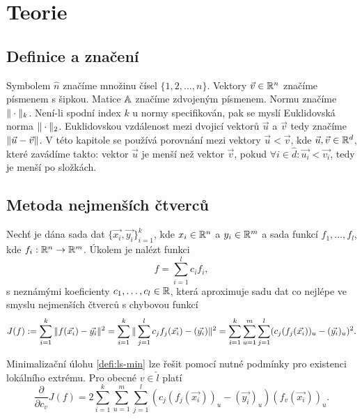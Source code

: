 \chapter{Teorie}

\section{Definice a značení}

Symbolem $\hat n$ značíme množinu čísel $\{1, 2, \ldots, n\}$. Vektory $\vec{v} \in \mathbb{R}^n$ značíme písmenem s šipkou. Matice $\mathbb{A}$ značíme zdvojeným písmenem. Normu značíme $\|\cdot\|_k$. Není-li spodní index $k$ u normy specifikován, pak se myslí Euklidovská norma $\|\cdot\|_2$. Euklidovskou vzdálenost mezi dvojicí vektorů $\vec{u}$ a $\vec{v}$ tedy značíme $\|\vec{u} - \vec{v}\|$. V této kapitole se používá porovnání mezi vektory $\vec{u} < \vec{v}$, kde $\vec{u}, \vec{v} \in \mathbb{R}^d$, které zavádíme takto: vektor $\vec{u}$ je menší než vektor $\vec{v}$, pokud $\forall i \in \hat{d}: \vec{u_i} < \vec{v_i}$, tedy je menší po složkách.

\section{Metoda nejmenších čtverců}

Nechť je dána sada dat $\{\vec{x_i}, \vec{y_i}\}_{i = 1}^k$, kde $x_i \in \mathbb{R}^n$ a $y_i \in \mathbb{R}^m$ a sada funkcí $f_1,\ldots,f_l$, kde $f_i: \mathbb{R}^n \rightarrow \mathbb{R}^m$. Úkolem je nalézt funkci
\begin{equation}
  \label{defi:ls}
  f = \sum_{i=1}^l c_if_i,
\end{equation}
s neznámými koeficienty $c_1,\ldots,c_l \in \mathbb{R}$, která aproximuje sadu dat co nejlépe ve smyslu nejmenších čtverců s chybovou funkcí
\begin{equation}
\label{defi:ls-min}
  J(f) := \sum_{i=1}^k \|f(\vec{x_i}) - \vec{y_i}\|^2 =
  \sum_{i=1}^k\|\sum_{j=1}^l c_jf_j(\vec{x_i}) - (\vec{y_i})\|^2 =
  \sum_{i=1}^k\sum_{u=1}^m\sum_{j=1}^l (c_j(f_j(\vec{x_i}))_u - (\vec{y_i})_u)^2.
\end{equation}

Minimalizační úlohu \ref{defi:ls-min} lze řešit pomocí nutné podmínky pro existenci lokálního extrému. Pro obecné $v \in \hat l$ platí
\begin{equation}
  \frac{\partial}{\partial c_v}J(f) = 2\sum_{i=1}^k\sum_{u=1}^m\sum_{j=1}^l(c_j(f_j(\vec{x_i}))_u - (\vec{y_i})_u)(f_v(\vec{x_i}))_u.
\end{equation}

